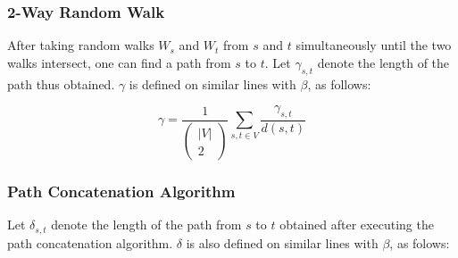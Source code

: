 \documentclass[10pt, conference, compsocconf]{IEEEtran}
\begin{document}
% 

\subsubsection{2-Way Random Walk}

After taking random walks $W_s$ and $W_t$ from $s$ and $t$ simultaneously 
until the two walks intersect, one can find a path from $s$ to $t$. Let $\gamma_{s,t}$ denote the length of the path thus obtained. $\gamma$ is defined on similar lines with $\beta$, as follows:

$$\gamma = \frac{1}{\left(\begin{array}{c} |V|\\ 2\end{array}\right)} \sum_{s,t \in V} \frac{\gamma_{s,t}}{d(s,t)}$$

% 

\subsubsection{Path Concatenation Algorithm}
Let $\delta_{s,t}$ denote the length of the path from $s$ to $t$ obtained after executing the path concatenation algorithm. $\delta$ is also defined on similar lines with $\beta$, as folows:
\end{document}
